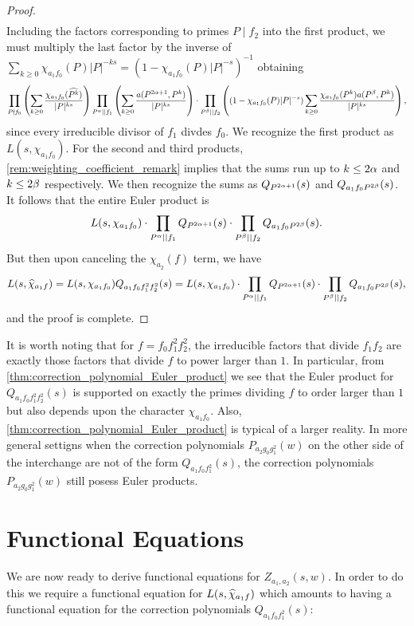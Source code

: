 \documentclass[12pt,reqno,oneside]{amsart}
\begin{document}
\begin{proof}
\begin{align*}
        \end{align*}
        Including the factors corresponding to primes $P \mid f_{2}$ into the first product, we must multiply the last factor by the inverse of $\sum_{k \ge 0}\chi_{a_{1}f_{0}}(P)|P|^{-ks} = (1-\chi_{a_{1}f_{0}}(P)|P|^{-s})^{-1}$ obtaining
        \[
            \prod_{P \nmid f_{0}}\left(\sum_{k \ge 0}\frac{\chi_{a_{1}f_{0}}(\widehat{P^{k}})}{|P|^{ks}}\right)\prod_{P^{\alpha} \mid\mid f_{1}}\left(\sum_{k \ge 0}\frac{a(P^{2\alpha+1},P^{k})}{|P|^{ks}}\right) \cdot \prod_{P^{\beta} \mid\mid f_{2}}\left((1-\chi_{a_{1}f_{0}}(P)|P|^{-s})\sum_{k \ge 0}\frac{\chi_{a_{1}f_{0}}(P^{k})a(P^{\beta},P^{k})}{|P|^{ks}}\right),
        \]
        since every irreducible divisor of $f_{1}$ divdes $f_{0}$. We recognize the first product as $L(s,\chi_{a_{1}f_{0}})$. For the second and third products, \cref{rem:weighting_coefficient_remark} implies that the sums run up to $k \le 2\alpha$ and $k \le 2\beta$ respectively. We then recognize the sums as $Q_{P^{2\alpha+1}}(s)$ and $Q_{a_{1}f_{0}P^{2\beta}}(s)$. It follows that the entire Euler product is
        \[
            L(s,\chi_{a_{1}f_{0}}) \cdot \prod_{P^{\alpha} \mid\mid f_{1}}Q_{P^{2\alpha+1}}(s) \cdot \prod_{P^{\beta} \mid\mid f_{2}}Q_{a_{1}f_{0}P^{2\beta}}(s).
        \]
        But then upon canceling the $\chi_{a_{2}}(f)$ term, we have
        \[
            L(s,\widehat{\chi}_{a_{1}f}) = L(s,\chi_{a_{1}f_{0}})Q_{a_{1}f_{0}f_{1}^{2}f_{2}^{2}}(s) = L(s,\chi_{a_{1}f_{0}}) \cdot \prod_{P^{\alpha} \mid\mid f_{1}}Q_{P^{2\alpha+1}}(s) \cdot \prod_{P^{\beta} \mid\mid f_{2}}Q_{a_{1}f_{0}P^{2\beta}}(s),
        \]
        and the proof is complete.
    \end{proof}

    It is worth noting that for $f = f_{0}f_{1}^{2}f_{2}^{2}$, the irreducible factors that divide $f_{1}f_{2}$ are exactly those factors that divide $f$ to power larger than $1$. In particular, from \cref{thm:correction_polynomial_Euler_product} we see that the Euler product for $Q_{a_{1}f_{0}f_{1}^{2}f_{2}^{2}}(s)$ is supported on exactly the primes dividing $f$ to order larger than $1$ but also depends upon the character $\chi_{a_{1}f_{0}}$. Also, \cref{thm:correction_polynomial_Euler_product} is typical of a larger reality. In more general settigns when the correction polynomials $P_{a_{2}g_{0}g_{1}^{2}}(w)$ on the other side of the interchange are not of the form $Q_{a_{1}f_{0}f_{1}^{2}}(s)$, the correction polynomials $P_{a_{2}g_{0}g_{1}^{2}}(w)$ still posess Euler products.
\section{Functional Equations}
    We are now ready to derive functional equations for $Z_{a_{1},a_{2}}(s,w)$. In order to do this we require a functional equation for $L(s,\widehat{\chi}_{a_{1}f})$ which amounts to having a functional equation for the correction polynomials $Q_{a_{1}f_{0}f_{1}^{2}}(s)$:
\end{document}
